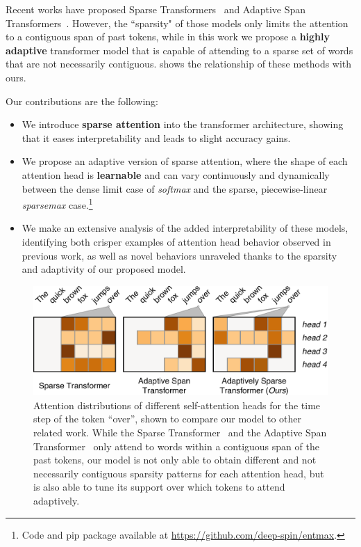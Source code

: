 Recent works have proposed Sparse
Transformers~\citep{openai_sparse_transf} and Adaptive Span
Transformers~\citep{Sukhbaatar2019}. However, the ``sparsity" of those
models only limits the attention to a contiguous span of past tokens,
while in this work we propose a \textbf{highly adaptive} transformer
model that is capable of attending to a sparse set of words that are
not necessarily contiguous.  shows the
relationship of these methods with ours.

Our contributions are the following:

\begin{itemize}
    \item We introduce \textbf{sparse attention} into the
          transformer architecture, showing that it eases
          interpretability and leads to slight accuracy gains.
    \item We propose an adaptive version of sparse attention,
          where the shape of each attention head is {\bf learnable} and can vary continuously and
          dynamically between the dense limit case of \emph{softmax} and the sparse,
          piecewise-linear \emph{sparsemax} case.\footnote{
              Code and pip package available at \url{https://github.com/deep-spin/entmax}.}
    \item We make an extensive analysis of the added interpretability of these
          models, identifying both crisper examples of attention head behavior observed in
          previous work, as well as novel behaviors unraveled thanks to the sparsity
          and adaptivity of our proposed model.
\end{itemize}

\begin{figure}[htbp]
    \centering
    \includegraphics[width=0.95\columnwidth]{Figures/comparison.pdf}
    \caption[Comparison of Adaptively Sparse Transformers to related work.]{
        Attention distributions of different self-attention heads for the
        time step of the token ``over'', shown to compare our model to other
        related work. While the Sparse
        Transformer~\citep{openai_sparse_transf} and the Adaptive Span
        Transformer~\citep{Sukhbaatar2019} only attend to words within a
        contiguous span of the past tokens, our model is not only able to
        obtain different and not necessarily contiguous sparsity patterns for
        each attention head, but is also able to tune its support over which
        tokens to attend adaptively.}
    \label{fig:comparison}
\end{figure}

